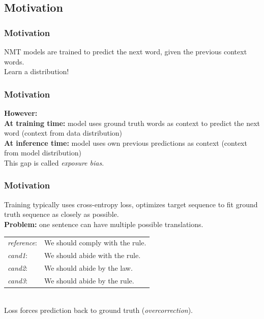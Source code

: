 \documentclass{beamer}
\begin{document}

\subsection{Motivation}

\begin{frame}
    \frametitle{Motivation}
    NMT models are trained to predict the next word, given the previous context words.\\
    \bigskip
    Learn a distribution!
\end{frame}


\begin{frame}
    \frametitle{Motivation}
    \textbf{However:}\\
    \bigskip
    \textbf{At training time:} model uses ground truth words as context to predict the next word (context from data distribution)\\
    \bigskip
    \textbf{At inference time:} model uses own previous predictions as context (context from model distribution)\\
    \bigskip
    This gap is called \emph{exposure bias}.
\end{frame}


\begin{frame}
    \frametitle{Motivation}
    Training typically uses cross-entropy loss, optimizes target sequence to fit ground truth sequence as closely as possible.\\
    \bigskip
    \textbf{Problem:} one sentence can have multiple possible translations.\\
    \medskip
    \begin{tabular}{ll}
        \centering
        {\em reference}: & We should comply with the rule. \\
        {\em cand1}: & We should abide with the rule. \\
        {\em cand2}: & We should abide by the law. \\
        {\em cand3}: & We should abide by the rule. \\
    \end{tabular}\\
    \bigskip
    Loss forces prediction back to ground truth (\emph{overcorrection}).
\end{frame}
\end{document}

